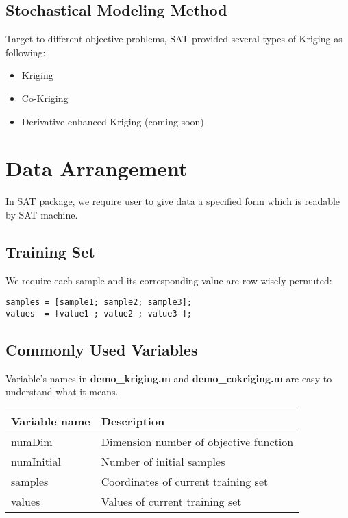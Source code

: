 \documentclass[letterpaper,10pt,english]{sphinxmanual}
\begin{document}
\section{Stochastical Modeling Method}
\label{intro:stochastical-modeling-method}
Target to different objective problems, SAT provided several types of Kriging as following:
\begin{itemize}
\item {} 
Kriging

\item {} 
Co-Kriging

\item {} 
Derivative-enhanced Kriging (coming soon)

\end{itemize}


\chapter{Data Arrangement}
\label{data::doc}\label{data:data-arrangement}
In SAT package,
we require user to give data a specified form which is readable by SAT machine.


\section{Training Set}
\label{data:training-set}
We require each sample and its corresponding value are row-wisely permuted:

\begin{Verbatim}[commandchars=\\\{\}]
samples = [sample1; sample2; sample3];
values  = [value1 ; value2 ; value3 ];
\end{Verbatim}


\section{Commonly Used Variables}
\label{data:commonly-used-variables}
Variable's names in \textbf{demo\_kriging.m} and \textbf{demo\_cokriging.m} are easy to understand what it means.

\begin{tabulary}{\linewidth}{|L|L|}
\hline
\textsf{\relax 
Variable name
} & \textsf{\relax 
Description
}\\
\hline
numDim
 & 
Dimension number of objective function
\\

numInitial
 & 
Number of initial samples
\\

samples
 & 
Coordinates of current training set
\\

values
 & 
Values of current training set
\\
\hline\end{tabulary}
\end{document}
